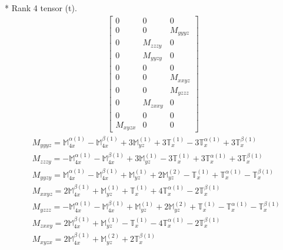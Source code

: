 \documentclass[fleqn,8pt,landscape]{jsarticle}
\begin{document}
* Rank 4 tensor (t).
\begin{align*}
\begin{bmatrix} 0 & 0 & 0 \\ 0 & 0 & M_{yyyz} \\ 0 & M_{zzzy} & 0 \\ 0 & M_{yyzy} & 0 \\ 0 & 0 & 0 \\ 0 & 0 & M_{xxyz} \\ 0 & 0 & M_{yzzz} \\ 0 & M_{zxxy} & 0 \\ 0 & 0 & 0 \\ M_{xyzx} & 0 & 0 \end{bmatrix}
\end{align*}
\begin{align*}
& M_{yyyz} = \mathbb{M}_{4x}^{\alpha(1)} - \mathbb{M}_{4x}^{\beta(1)} + 3 \mathbb{M}_{yz}^{(1)} + 3 \mathbb{T}_{x}^{(1)} - 3 \mathbb{T}_{x}^{\alpha(1)} + 3 \mathbb{T}_{x}^{\beta(1)} \\
& M_{zzzy} = - \mathbb{M}_{4x}^{\alpha(1)} - \mathbb{M}_{4x}^{\beta(1)} + 3 \mathbb{M}_{yz}^{(1)} - 3 \mathbb{T}_{x}^{(1)} + 3 \mathbb{T}_{x}^{\alpha(1)} + 3 \mathbb{T}_{x}^{\beta(1)} \\
& M_{yyzy} = \mathbb{M}_{4x}^{\alpha(1)} - \mathbb{M}_{4x}^{\beta(1)} + \mathbb{M}_{yz}^{(1)} + 2 \mathbb{M}_{yz}^{(2)} - \mathbb{T}_{x}^{(1)} + \mathbb{T}_{x}^{\alpha(1)} - \mathbb{T}_{x}^{\beta(1)} \\
& M_{xxyz} = 2 \mathbb{M}_{4x}^{\beta(1)} + \mathbb{M}_{yz}^{(1)} + \mathbb{T}_{x}^{(1)} + 4 \mathbb{T}_{x}^{\alpha(1)} - 2 \mathbb{T}_{x}^{\beta(1)} \\
& M_{yzzz} = - \mathbb{M}_{4x}^{\alpha(1)} - \mathbb{M}_{4x}^{\beta(1)} + \mathbb{M}_{yz}^{(1)} + 2 \mathbb{M}_{yz}^{(2)} + \mathbb{T}_{x}^{(1)} - \mathbb{T}_{x}^{\alpha(1)} - \mathbb{T}_{x}^{\beta(1)} \\
& M_{zxxy} = 2 \mathbb{M}_{4x}^{\beta(1)} + \mathbb{M}_{yz}^{(1)} - \mathbb{T}_{x}^{(1)} - 4 \mathbb{T}_{x}^{\alpha(1)} - 2 \mathbb{T}_{x}^{\beta(1)} \\
& M_{xyzx} = 2 \mathbb{M}_{4x}^{\beta(1)} + \mathbb{M}_{yz}^{(2)} + 2 \mathbb{T}_{x}^{\beta(1)}
\end{align*}
\end{document}
